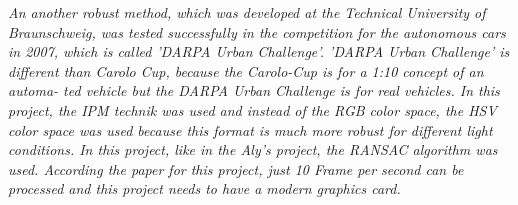 \emph{\color{blue}An another robust method\cite{A_Fast_and_Robust_Approach}, which was developed at the Technical University of Braunschweig, was tested successfully in the competition for the autonomous cars in 2007, which is called 'DARPA Urban Challenge'. 'DARPA Urban Challenge' is different than Carolo Cup, because the Carolo-Cup is for a 1:10 concept of an automa-
ted vehicle but the DARPA Urban Challenge is for real vehicles. In this project, the IPM technik was used and instead of the RGB color space, the HSV color space was used because this format is much more robust for different light conditions. In this project, like in the Aly's project, the RANSAC algorithm was used. According the paper for this project, just 10 Frame per second can be processed and this project needs to have a modern graphics card. } 

